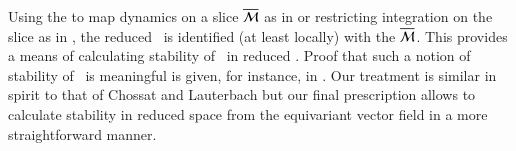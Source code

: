 


Using the {\mframes} to map dynamics on a slice $\overline{\cal M}$
as in  or restricting
integration on the slice as in ,
the reduced \statesp\ is
identified (at least locally) with the {\slice}
${\overline{\cal M}}$. This provides a means of calculating stability
of \reqva\ in reduced \statesp. Proof that such a notion of stability
of \reqva\ is meaningful is given, for instance, in .
Our treatment is similar in spirit 
to that of Chossat and Lauterbach but our final 
prescription allows to calculate stability in reduced space
from the equivariant vector field in a more straightforward manner.

